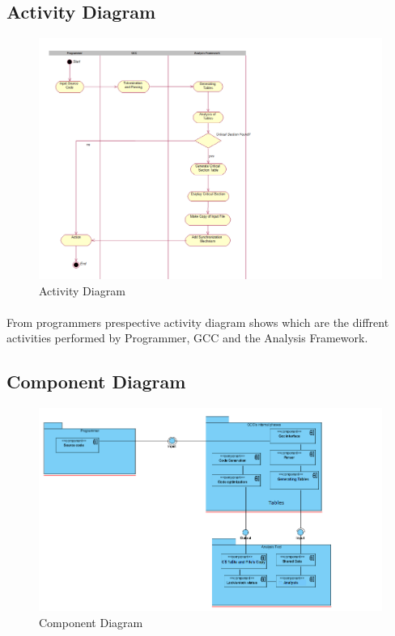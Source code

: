 \subsection{Activity Diagram}
\begin{figure}[H]
\centering
\includegraphics[scale=0.6]{activity.png}
\caption{Activity Diagram}
\label{<<Label>>}
\end{figure}
\paragraph{}
From programmers prespective activity diagram shows which are the diffrent activities performed by Programmer, GCC and the Analysis Framework.

\subsection{Component Diagram}
\begin{figure}[H]
\centering
\includegraphics[scale=0.6]{component.png}
\caption{Component Diagram}
\label{<<Label>>}
\end{figure}
